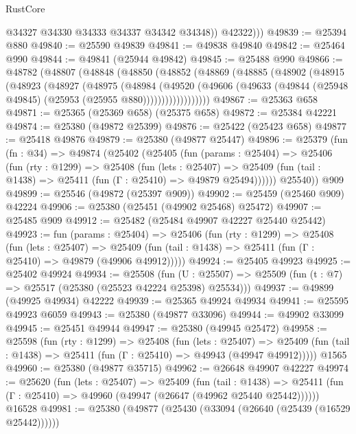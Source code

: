\begin{lexlean}{RustCore}
\begin{coremodule}
              @34327
              @34330
              @34333
              @34337
              @34342
              @34348))
          @42322)))
@49839 := @25394 @880
@49840 := @25590 @49839
@49841 := @49838 @49840
@49842 := @25464 @990
@49844 := @49841 (@25944 @49842)
@49845 := @25488 @990
@49866 := @48782
    (@48807
      (@48848
        (@48850
          (@48852
            (@48869
              (@48885
                (@48902
                  (@48915
                    (@48923
                      (@48927
                        (@48975
                          (@48984
                            (@49520
                              (@49606
                                (@49633
                                  (@49844 (@25948 @49845) (@25953 (@25955 @880))))))))))))))))))
@49867 := @25363 @658
@49871 := @25365 (@25369 @658) (@25375 @658)
@49872 := @25384 @42221
@49874 := @25380 (@49872 @25399)
@49876 := @25422 (@25423 @658)
@49877 := @25418 @49876
@49879 := @25380 (@49877 @25447)
@49896 := @25379
    (fun (fn : @34) =>
    @49874
      (@25402
        (@25405
          (fun (params : @25404) =>
          @25406
            (fun (rty : @1299) =>
            @25408
              (fun (lets : @25407) =>
              @25409 (fun (tail : @1438) => @25411 (fun (Γ : @25410) => @49879 @25494))))))
        @25540))
    @909
@49899 := @25546 (@49872 (@25397 @909))
@49902 := @25459 (@25460 @909) @42224
@49906 := @25380 (@25451 (@49902 @25468) @25472)
@49907 := @25485 @909
@49912 := @25482 (@25484 @49907 @42227 @25440 @25442)
@49923 := fun (params : @25404) =>
  @25406
    (fun (rty : @1299) =>
    @25408
      (fun (lets : @25407) =>
      @25409 (fun (tail : @1438) => @25411 (fun (Γ : @25410) => @49879 (@49906 @49912)))))
@49924 := @25405 @49923
@49925 := @25402 @49924
@49934 := @25508
    (fun (U : @25507) => @25509 (fun (t : @7) => @25517 (@25380 (@25523 @42224 @25398) @25534)))
@49937 := @49899 (@49925 @49934) @42222
@49939 := @25365 @49924 @49934
@49941 := @25595 @49923 @6059
@49943 := @25380 (@49877 @33096)
@49944 := @49902 @33099
@49945 := @25451 @49944
@49947 := @25380 (@49945 @25472)
@49958 := @25598
    (fun (rty : @1299) =>
    @25408
      (fun (lets : @25407) =>
      @25409 (fun (tail : @1438) => @25411 (fun (Γ : @25410) => @49943 (@49947 @49912)))))
    @1565
@49960 := @25380 (@49877 @35715)
@49962 := @26648 @49907 @42227
@49974 := @25620
    (fun (lets : @25407) =>
    @25409
      (fun (tail : @1438) =>
      @25411 (fun (Γ : @25410) => @49960 (@49947 (@26647 (@49962 @25440 @25442))))))
    @16528
@49981 := @25380 (@49877 (@25430 (@33094 (@26640 (@25439 (@16529 @25442))))))

\end{coremodule}
\end{lexlean}
